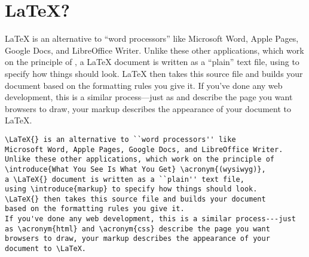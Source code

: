 \chapter{\texorpdfstring{\LaTeX}{LaTeX}?}
\LaTeX{} is an alternative to ``word processors'' like
Microsoft Word, Apple Pages, Google Docs, and LibreOffice Writer.
Unlike these other applications, which work on the principle of
 ,
a \LaTeX{} document is written as a ``plain'' text file,
using  to specify how things should look.
\LaTeX{} then takes this source file and builds your document
based on the formatting rules you give it.
If you've done any web development, this is a similar process---just
as  and  describe the page you want
browsers to draw, your markup describes the appearance of your
document to \LaTeX.

\begin{leftfigure}
\begin{lstlisting}
\LaTeX{} is an alternative to ``word processors'' like
Microsoft Word, Apple Pages, Google Docs, and LibreOffice Writer.
Unlike these other applications, which work on the principle of
\introduce{What You See Is What You Get} \acronym{(wysiwyg)},
a \LaTeX{} document is written as a ``plain'' text file,
using \introduce{markup} to specify how things should look.
\LaTeX{} then takes this source file and builds your document
based on the formatting rules you give it.
If you've done any web development, this is a similar process---just
as \acronym{html} and \acronym{css} describe the page you want
browsers to draw, your markup describes the appearance of your
document to \LaTeX.
\end{lstlisting}
\end{leftfigure}

